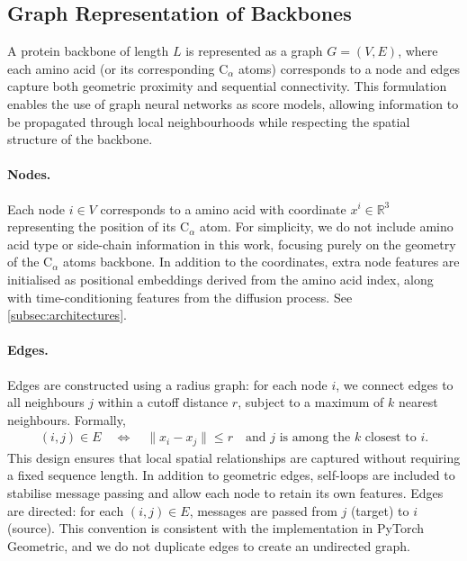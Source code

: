 \documentclass[a4paper,12pt]{article}
\begin{document}
\subsection{Graph Representation of Backbones}\label{subsec:graph-repr}
A protein backbone  of length \(L\) is represented as a graph \(G=(V,E)\), where each amino acid (or its corresponding C\(_\alpha\) atoms) corresponds to a node and edges capture both geometric proximity and sequential connectivity. This formulation enables the use of graph neural networks as score models, allowing information to be propagated through local neighbourhoods while respecting the spatial structure of the backbone. 

\paragraph{Nodes.}
Each node \(i \in V\) corresponds to a amino acid with coordinate \(x^i \in \mathbb{R}^3\) representing the position of its C\(_\alpha\) atom. For simplicity, we do not include amino acid type or side-chain information in this work, focusing purely on the geometry of the C\(_\alpha\) atoms backbone. In addition to the coordinates, extra node features are initialised as positional embeddings derived from the amino acid index, along with time-conditioning features from the diffusion process. See \cref{subsec:architectures}.

\paragraph{Edges.}
Edges are constructed using a radius graph: for each node \(i\), we connect edges to all neighbours \(j\) within a cutoff distance \(r\), subject to a maximum of \(k\) nearest neighbours. Formally,
\begin{align*}
    (i,j) \in E \quad \Leftrightarrow \quad \|x_i - x_j\| \leq r \quad \text{and } j \text{ is among the } k \text{ closest to } i.
\end{align*}
This design ensures that local spatial relationships are captured without requiring a fixed sequence length. In addition to geometric edges, self-loops are included to stabilise message passing and allow each node to retain its own features. Edges are directed: for each \((i,j) \in E\), messages are passed from \(j\) (target) to \(i\) (source). This convention is consistent with the implementation in PyTorch Geometric, and we do not duplicate edges to create an undirected graph.
\end{document}

